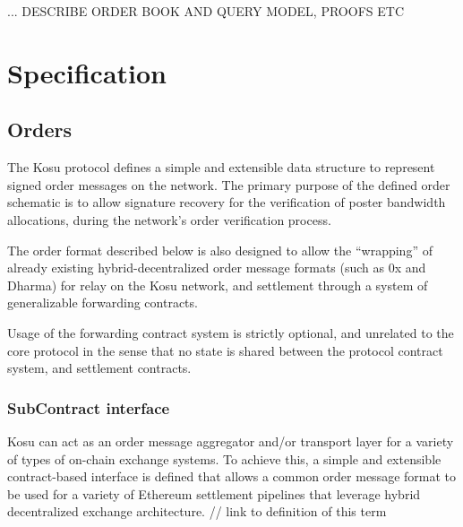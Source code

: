 \documentclass[9pt]{article}
\begin{document}
\medskip

\noindent ... DESCRIBE ORDER BOOK AND QUERY MODEL, PROOFS ETC
\clearpage
\pagebreak


\section{Specification}\label{specification}

\subsection{Orders}\label{orders}

\noindent The Kosu protocol defines a simple and extensible data structure to represent signed order messages on the network. The primary purpose of the defined order schematic is to allow signature recovery for the verification of poster bandwidth allocations, during the network’s order verification process.
\medskip

\noindent The order format described below is also designed to allow the “wrapping” of already existing hybrid-decentralized order message formats (such as 0x and Dharma) for relay on the Kosu network, and settlement through a system of generalizable forwarding contracts. 
\medskip 

\noindent Usage of the forwarding contract system is strictly optional, and unrelated to the core protocol in the sense that no state is shared between the protocol contract system, and settlement contracts.

\subsubsection{SubContract interface}\label{subcontract-interface}

\noindent Kosu can act as an order message aggregator and/or transport layer for a variety of types of on-chain exchange systems. To achieve this, a simple and extensible contract-based interface is defined that allows a common order message format to be used for a variety of Ethereum settlement pipelines that leverage hybrid decentralized exchange architecture. // link to definition of this term
\medskip
\end{document}
